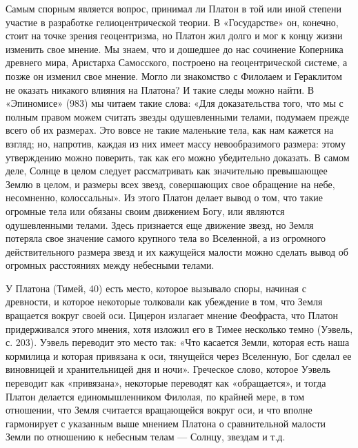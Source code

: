 Самым спорным является вопрос, принимал ли Платон в той или иной
степени участие в разработке гелиоцентрической теории. В «Государстве»
он, конечно, стоит на точке зрения геоцентризма, но Платон жил долго и
мог к концу жизни изменить свое мнение. Мы знаем, что и дошедшее до
нас сочинение Коперника древнего мира, Аристарха Самосского, построено
на геоцентрической системе, а позже он изменил свое мнение. Могло ли
знакомство с Филолаем и Гераклитом не оказать никакого влияния на
Платона? И такие следы можно найти. В «Эпиномисе» (983) мы читаем
такие слова: «Для доказательства того, что мы с полным правом можем
считать звезды одушевленными телами, подумаем прежде всего об их
размерах. Это вовсе не такие маленькие тела, как нам кажется на
взгляд; но, напротив, каждая из них имеет массу невообразимого
размера: этому утверждению можно поверить, так как его можно
убедительно доказать. В самом деле, Солнце в целом следует
рассматривать как значительно превышающее Землю в целом, и размеры
всех звезд, совершающих свое обращение на небе, несомненно,
колоссальны». Из этого Платон делает вывод о том, что такие огромные
тела или обязаны своим движением Богу, или являются одушевленными
телами. Здесь признается еще движение звезд, но Земля потеряла свое
значение самого крупного тела во Вселенной, а из огромного
действительного размера звезд и их кажущейся малости можно сделать
вывод об огромных расстояниях между небесными телами.

У Платона (Тимей, 40) есть место, которое вызывало споры, начиная с
древности, и которое некоторые толковали как убеждение в том, что
Земля вращается вокруг своей оси. Цицерон излагает мнение Феофраста,
что Платон придерживался этого мнения, хотя изложил его в Тимее
несколько темно (Уэвель, с. 203). Уэвель переводит это место так: «Что
касается Земли, которая есть наша кормилица и которая привязана к оси,
тянущейся через Вселенную, Бог сделал ее виновницей и хранительницей
дня и ночи». Греческое слово, которое Уэвель переводит как
«привязана», некоторые переводят как «обращается», и тогда Платон
делается единомышленником Филолая, по крайней мере, в том отношении,
что Земля считается вращающейся вокруг оси, и что вполне гармонирует с
указанным выше мнением Платона о сравнительной малости Земли по
отношению к небесным телам --- Солнцу, звездам и т.д.

